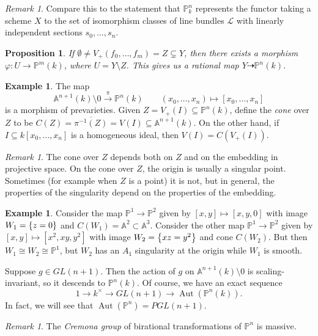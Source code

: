 \documentclass[leqno, openany]{memoir}
\newtheorem{prop}[thm]{Proposition}
\theoremstyle{definition}
\newtheorem{exm}[thm]{Example}
\theoremstyle{remark}
\newtheorem{rmk}[thm]{Remark}
\theoremstyle{plain}
\theoremstyle{definition}
\theoremstyle{remark}
\newcommand{\A}{\mathbb{A}}
\renewcommand{\P}{\mathbb{P}}
\newcommand{\mc}[1]{\mathcal{#1}}
\newcommand{\ol}[1]{\overline{#1}}
\DeclareMathOperator{\Aut}{Aut}
\begin{document}
\begin{rmk} Compare this to the statement that $\P^n_k$ represents the functor
taking a scheme $X$ to the set of isomorphism classes of line bundles $\mc{L}$
with linearly independent sections $s_0, \ldots, s_n$.  \end{rmk}

\begin{prop} If $\emptyset \neq V_+(f_0, \ldots, f_m) = Z \subsetneq Y$, then
there exists a morphism $\varphi \colon U \to \P^m(k)$, where $U = Y \setminus
Z$. This gives us a \textit{rational map} $Y \dashrightarrow \P^n(k)$.
\end{prop}

\begin{exm} The map \[ \A^{n+1}(k) \setminus \qty{0} \xrightarrow{\pi} \P^n(k)
\qquad (x_0, \ldots, x_n) \mapsto [x_0, \ldots, x_n] \] is a morphism of
prevarieties. Given $Z = V_+(I) \subseteq \P^n(k)$, define the \textit{cone}
over $Z$ to be $C(Z) = \ol{\pi^{-1}(Z)} = V(I) \subseteq \A^{n+1}(k)$. On the
other hand, if $I \subseteq k[x_0, \ldots, x_n]$ is a homogeneous ideal, then
$V(I) = C(V_+(I))$.  \end{exm}

\begin{rmk} The cone over $Z$ depends both on $Z$ and on the embedding in
    projective space. On the cone over $Z$, the origin is usually a singular
    point. Sometimes (for example when $Z$ is a point) it is not, but in
    general, the properties of the singularity depend on the properties of the
    embedding.  \end{rmk}

\begin{exm} Consider the map $\P^1 \to \P^2$ given by $[x,y] \mapsto [x,y,0]$
    with image $W_1 = \qty{z = 0}$ and $C(W_1) = \A^2 \subset \A^3$. Consider
    the other map $\P^1 \to \P^2$ given by $[x,y] \mapsto [x^2, xy, y^2]$ with
    image $W_2 = \qty{xz = y^2}$ and cone $C(W_2)$. But then $W_1 \cong W_2
    \cong \P^1$, but $W_2$ has an $A_1$ singularity at the origin while $W_1$
    is smooth.  \end{exm}

Suppose $g \in GL(n+1)$. Then the action of $g$ on $\A^{n+1}(k) \setminus
\qty{0}$ is scaling-invariant, so it descends to $\P^n(k)$. Of course, we have
an exact sequence \[ 1 \to k^{\times} \to GL(n+1) \to \Aut(\P^n(k)). \] In
fact, we will see that $\Aut(\P^n) = PGL(n+1)$.

\begin{rmk} The \textit{Cremona group} of birational transformations of $\P^n$
is massive.  \end{rmk}
\end{document}
